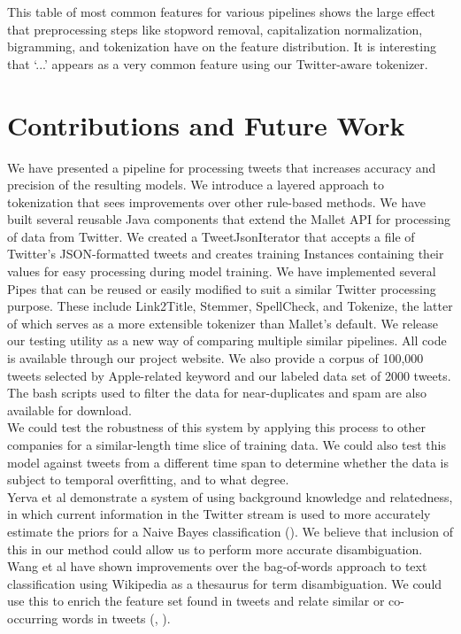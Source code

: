 \documentclass[letterpaper]{article}
\begin{document}
This table of most common features for various pipelines shows the large effect that preprocessing steps like stopword removal, capitalization normalization, bigramming, and tokenization have on the feature distribution. It is interesting that `...' appears as a very common feature using our Twitter-aware tokenizer.

\section{Contributions and Future Work}
We have presented a pipeline for processing tweets that increases accuracy and precision of the resulting models. We introduce a layered approach to tokenization that sees improvements over other rule-based methods. We have built several reusable Java components that extend the Mallet API for processing of data from Twitter. We created a TweetJsonIterator that accepts a file of Twitter's JSON-formatted tweets and creates training Instances containing their values for easy processing during model training. We have implemented several Pipes that can be reused or easily modified to suit a similar Twitter processing purpose. These include Link2Title, Stemmer, SpellCheck, and Tokenize, the latter of which serves as a more extensible tokenizer than Mallet's default. We release our testing utility as a new way of comparing multiple similar pipelines. All code is available through our project website. We also provide a corpus of 100,000 tweets selected by Apple-related keyword and our labeled data set of 2000 tweets. The bash scripts used to filter the data for near-duplicates and spam are also available for download.\\

We could test the robustness of this system by applying this process to other companies for a similar-length time slice of training data. We could also test this model against tweets from a different time span to determine whether the data is subject to temporal overfitting, and to what degree.\\

Yerva et al demonstrate a system of using background knowledge and relatedness, in which current information in the Twitter stream is used to more accurately estimate the priors for a Naive Bayes classification (\citeauthor{journals/ijcsa/YervaMA12}). We believe that inclusion of this in our method could allow us to perform more accurate disambiguation.\\

Wang et al have shown improvements over the bag-of-words approach to text classification using Wikipedia as a thesaurus for term disambiguation. We could use this to enrich the feature set found in tweets and relate similar or co-occurring words in tweets (\citeauthor{Wang:2008:UWC:1510528.1511383}, \citeauthor{Wang:2009:UWK:1554488.1554492}).\\
\end{document}
